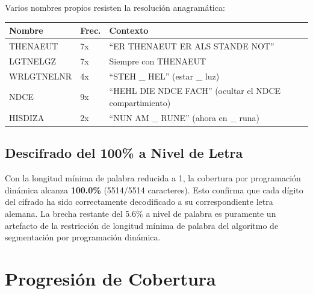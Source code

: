 \documentclass[11pt,a4paper]{article}
\begin{document}
Varios nombres propios resisten la resoluci\'{o}n anagram\'{a}tica:

\begin{table}[h]
\centering
\begin{tabular}{lll}
\toprule
Nombre & Frec. & Contexto \\
\midrule
THENAEUT & 7x & ``ER THENAEUT ER ALS STANDE NOT'' \\
LGTNELGZ & 7x & Siempre con THENAEUT \\
WRLGTNELNR & 4x & ``STEH \_ HEL'' (estar \_ luz) \\
NDCE & 9x & ``HEHL DIE NDCE FACH'' (ocultar el NDCE compartimiento) \\
HISDIZA & 2x & ``NUN AM \_ RUNE'' (ahora en \_ runa) \\
\bottomrule
\end{tabular}
\end{table}

\subsection{Descifrado del 100\% a Nivel de Letra}

Con la longitud m\'{i}nima de palabra reducida a 1, la cobertura por programaci\'{o}n din\'{a}mica alcanza \textbf{100.0\%} (5514/5514 caracteres). Esto confirma que cada d\'{i}gito del cifrado ha sido correctamente decodificado a su correspondiente letra alemana. La brecha restante del 5.6\% a nivel de palabra es puramente un artefacto de la restricci\'{o}n de longitud m\'{i}nima de palabra del algoritmo de segmentaci\'{o}n por programaci\'{o}n din\'{a}mica.

\section{Progresi\'{o}n de Cobertura}
\end{document}
